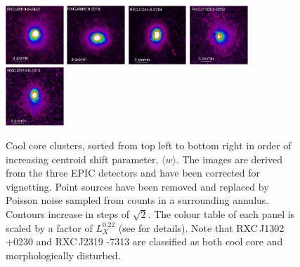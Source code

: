 \documentclass[oldversion]{aa}
\begin{document}
\begin{figure}[]
\includegraphics[scale=1.,angle=0,keepaspectratio,width=0.195\textwidth]{0944fa1f.ps}
\hfill
\includegraphics[scale=1.,angle=0,keepaspectratio,width=0.195\textwidth]{0944fa1g.ps}
\hfill
\includegraphics[scale=1.,angle=0,keepaspectratio,width=0.195\textwidth]{0944fa1h.ps}
\hfill
\includegraphics[scale=1.,angle=0,keepaspectratio,width=0.195\textwidth]{0944fa1i.ps}
\hfill
\includegraphics[scale=1.,angle=0,keepaspectratio,width=0.195\textwidth]{0944fa1j.ps}


\caption{{\footnotesize Cool core clusters, sorted from top left to bottom right in order of increasing centroid shift parameter, $\langle w \rangle$. The images are derived from the three EPIC detectors and have been corrected for vignetting. Point sources have been removed and replaced by Poisson noise sampled from counts in a surrounding annulus. Contours increase in steps of $\sqrt{2}$. The colour table of each panel is scaled by a factor of $L_X^{0.22}$ (see \citealt{boehringer07} for details). Note that RXC\,J1302 +0230 and RXC\,J2319 -7313 are classified as both cool core and morphologically disturbed. }}\label{fig:gallery1}   
\end{figure}
\end{document}
